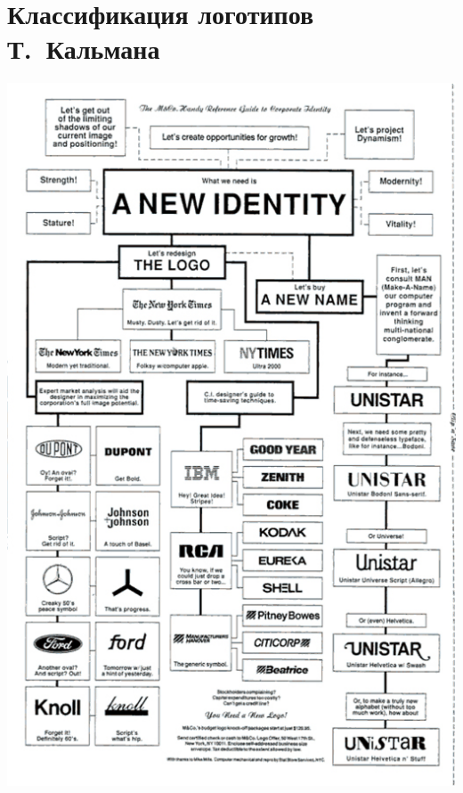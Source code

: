 \section{Классификация логотипов Т.~Кальмана}
\label{app:kalman}
\begin{center}
  \includegraphics[width=.8\linewidth]{images/supplement/kalman}
\end{center}

